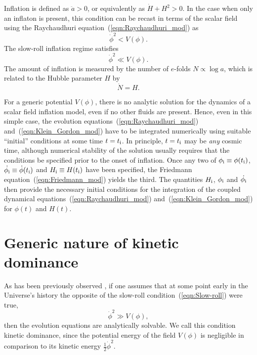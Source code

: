 Inflation is defined as $\ddot{a}>0$, or equivalently as $\dot{H}+H^2>0$. In the case when only an inflaton is present, this condition can be recast in terms of the scalar field using the Raychaudhuri equation~(\ref{eqn:Raychaudhuri_mod}) as
%
\begin{equation}
  \dot{\phi}^2<V(\phi).
  \label{eqn:Onset_inflation}
\end{equation}
%
The slow-roll inflation regime satisfies
%
\begin{equation}
  \dot{\phi}^2\ll V(\phi).
  \label{eqn:Slow-roll}
\end{equation}
%
The amount of inflation is measured by the number of $e$-folds $N\propto \log a$, which is related to the Hubble parameter $H$ by
%
\begin{equation}
  \dot{N}=H.\label{eqn:e-folds}
\end{equation}
%

For a generic potential $V(\phi)$, there is no analytic solution for the dynamics of a scalar field inflation model, even if no other fluids are present. Hence, even in this simple case, the evolution equations~(\ref{eqn:Raychaudhuri_mod}) and~(\ref{eqn:Klein_Gordon_mod}) have to be integrated numerically using suitable ``initial'' conditions at some time $t=t_{\mathrm{i}}$. In principle, $t=t_{\mathrm{i}}$ may be {\em any}\/ cosmic time, although numerical stability of the solution usually requires that the conditions be specified prior to the onset of inflation.  Once any two of $\phi_{\mathrm{i}} \equiv \phi(t_{\mathrm{i}})$, $\dot{\phi_{\mathrm{i}}} \equiv \dot{\phi}(t_{\mathrm{i}})$ and $H_{\mathrm{i}} \equiv H(t_{\mathrm{i}})$ have been specified, the Friedmann equation~(\ref{eqn:Friedmann_mod}) yields the third. The quantities $H_{\mathrm{i}}$, $\phi_{\mathrm{i}}$ and $\dot{\phi_{\mathrm{i}}}$ then provide the necessary initial conditions for the integration of the coupled dynamical equations~(\ref{eqn:Raychaudhuri_mod}) and~(\ref{eqn:Klein_Gordon_mod}) for $\phi(t)$ and $H(t)$.

\section{Generic nature of kinetic dominance}
\label{sec:The_generic_nature_of_kinetic_dominance}

As has been previously observed \citep{Linde_initial_conditions_1985, belinsky_inflationary_1985,particle_astrophysics_1990}, if one assumes that at some point early in the Universe's history the opposite of the slow-roll condition~(\ref{eqn:Slow-roll}) were true,
%
\begin{equation}
  \dot\phi^2\gg V(\phi),
  \label{eqn:kddef}
\end{equation}
%
then the evolution equations are analytically solvable.  We call this condition kinetic dominance, since the potential energy of the field $V(\phi)$ is negligible in comparison to its kinetic energy $\frac{1}{2}\dot\phi^2$.

